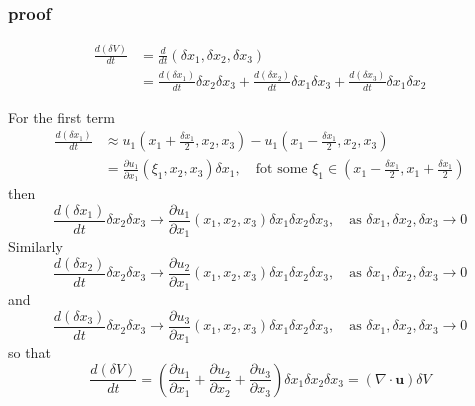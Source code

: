 \subsubsection{proof} %


\begin{equation}
\begin{aligned}
\frac{d(\delta V)}{dt}
&= \frac{d}{dt}(\delta x_1, \delta x_2, \delta x_3)\\
&= \frac{d(\delta x_1)}{dt} \delta x_2 \delta x_3
+ \frac{d(\delta x_2)}{dt} \delta x_1 \delta x_3
+ \frac{d(\delta x_3)}{dt} \delta x_1 \delta x_2
\end{aligned}
\end{equation}

For the first term
\begin{equation}
\begin{aligned}
\frac{d(\delta x_1)}{dt}
&\approx u_1\left(x_1+\frac{\delta x_1}{2}, x_2, x_3\right)
- u_1\left(x_1-\frac{\delta x_1}{2}, x_2, x_3\right)\\
&= \frac{\partial u_1}{\partial x_1}(\xi_1, x_2,x_3) \delta x_1,\quad \text{fot some $\xi_1\in\left(x_1-\frac{\delta x_1}{2},x_1+\frac{\delta x_1}{2}\right)$}
\end{aligned}
\end{equation}
then 
\begin{equation}
\frac{d(\delta x_1)}{dt}\delta x_2 \delta x_3 \to
\frac{\partial u_1}{\partial x_1}(x_1, x_2,x_3) \delta x_1\delta x_2 \delta x_3,
\quad \text{as $\delta x_1,\delta x_2, \delta x_3 \to 0$}
\end{equation}
Similarly 
\begin{equation}
\frac{d(\delta x_2)}{dt}\delta x_2 \delta x_3 \to
\frac{\partial u_2}{\partial x_1}(x_1, x_2,x_3) \delta x_1\delta x_2 \delta x_3,
\quad \text{as $\delta x_1,\delta x_2, \delta x_3 \to 0$}
\end{equation}
and 
\begin{equation}
\frac{d(\delta x_3)}{dt}\delta x_2 \delta x_3 \to
\frac{\partial u_3}{\partial x_1}(x_1, x_2,x_3) \delta x_1\delta x_2 \delta x_3,
\quad \text{as $\delta x_1,\delta x_2, \delta x_3 \to 0$}
\end{equation}
so that 
\begin{equation}
\frac{d(\delta V)}{dt} = \left(
\frac{\partial u_1}{\partial x_1}
+ \frac{\partial u_2}{\partial x_2}
+ \frac{\partial u_3}{\partial x_3}
\right) \delta x_1\delta x_2 \delta x_3
= (\nabla \cdot \textbf{u}) \delta V
\end{equation}

